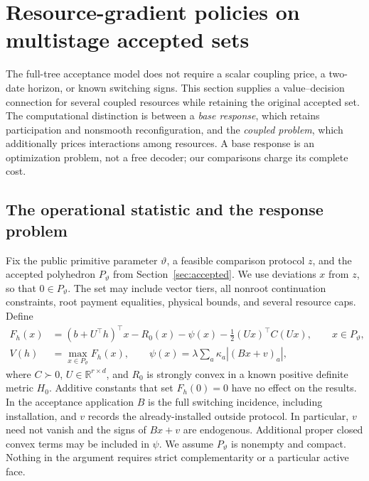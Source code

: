 \section{Resource-gradient policies on multistage accepted sets}\label{sec:r15-bridge}
The full-tree acceptance model does not require a scalar coupling price, a two-date horizon, or known switching signs. This section supplies a value--decision connection for several coupled resources while retaining the original accepted set. The computational distinction is between a \emph{base response}, which retains participation and nonsmooth reconfiguration, and the \emph{coupled problem}, which additionally prices interactions among resources. A base response is an optimization problem, not a free decoder; our comparisons charge its complete cost.

\subsection{The operational statistic and the response problem}
Fix the public primitive parameter $\vartheta$, a feasible comparison protocol $z$, and the accepted polyhedron $P_\vartheta$ from Section~\ref{sec:accepted}. We use deviations $x$ from $z$, so that $0\in P_\vartheta$. The set may include vector tiers, all nonroot continuation constraints, root payment equalities, physical bounds, and several resource caps. Define
\begin{equation}\label{eq:r15-objective}
 \begin{split}
 F_h(x)&=(b+U^\top h)^\top x-R_0(x)-\psi(x)
                    -\tfrac12(Ux)^\top C(Ux),\qquad x\in P_\vartheta,\\
 V(h)&=\max_{x\in P_\vartheta} F_h(x),\qquad
 \psi(x)=\lambda\sum_a\kappa_a|(Bx+v)_a|,
 \end{split}
\end{equation}
where $C\succ0$, $U\in\mathbb R^{r\times d}$, and $R_0$ is strongly convex in a known positive definite metric $H_0$. Additive constants that set $F_h(0)=0$ have no effect on the results. In the acceptance application $B$ is the full switching incidence, including installation, and $v$ records the already-installed outside protocol. In particular, $v$ need not vanish and the signs of $Bx+v$ are endogenous. Additional proper closed convex terms may be included in $\psi$. We assume $P_\vartheta$ is nonempty and compact. Nothing in the argument requires strict complementarity or a particular active face.

